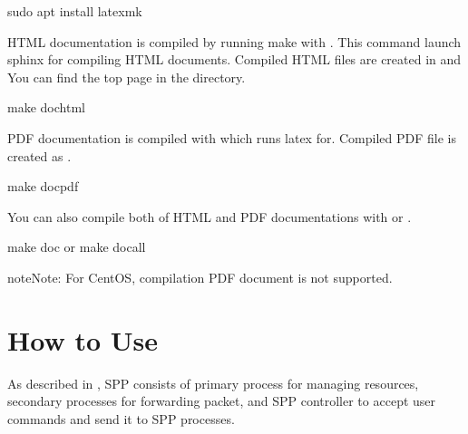 \documentclass[a4paper,11pt,openany,oneside,english]{sphinxmanual}
\begin{document}
\begin{sphinxVerbatim}[commandchars=\\\{\},formatcom=\footnotesize]
 sudo apt install latexmk
\end{sphinxVerbatim}

HTML documentation is compiled by running make with . This
command launch sphinx for compiling HTML documents.
Compiled HTML files are created in  and
You can find the top page  in the directory.

\begin{sphinxVerbatim}[commandchars=\\\{\},formatcom=\footnotesize]
 make doc\PYGZhy{}html
\end{sphinxVerbatim}

PDF documentation is compiled with  which runs latex for.
Compiled PDF file is created as .

\begin{sphinxVerbatim}[commandchars=\\\{\},formatcom=\footnotesize]
 make doc\PYGZhy{}pdf
\end{sphinxVerbatim}

You can also compile both of HTML and PDF documentations with  or
.

\begin{sphinxVerbatim}[commandchars=\\\{\},formatcom=\footnotesize]
 make doc
 or
 make doc\PYGZhy{}all
\end{sphinxVerbatim}

\begin{sphinxadmonition}{note}{Note:}
For CentOS, compilation PDF document is not supported.
\end{sphinxadmonition}


\section{How to Use}
\label{\detokenize{gsg/howto_use:how-to-use}}\label{\detokenize{gsg/howto_use:spp-gsg-howto-use}}\label{\detokenize{gsg/howto_use::doc}}
As described in {\hyperref[\detokenize{design/spp:spp-overview-design}]{}}, SPP consists of
primary process for managing resources, secondary processes for
forwarding packet, and SPP controller to accept user commands and
send it to SPP processes.
\end{document}
